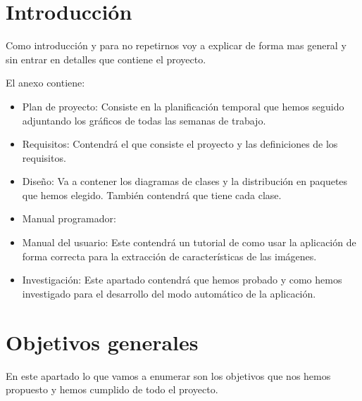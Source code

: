 
\section{Introducción}
Como introducción y para no repetirnos voy a explicar de forma mas general y sin entrar en detalles que contiene el proyecto.


El anexo contiene:

\begin{itemize}
\item Plan de proyecto: Consiste en la planificación temporal que hemos seguido adjuntando los gráficos de todas las semanas de trabajo.
\item Requisitos: Contendrá el que consiste el proyecto y las definiciones de los requisitos.
\item Diseño: Va a contener los diagramas de clases y la distribución en paquetes que hemos elegido. También contendrá que tiene cada clase.
\item Manual programador:
\item Manual del usuario: Este contendrá un tutorial de como usar la aplicación de forma correcta para la extracción de características de las imágenes.
\item Investigación: Este apartado contendrá que hemos probado y como hemos investigado para el desarrollo del modo automático de la aplicación.
\end{itemize}

\section{Objetivos generales}
En este apartado lo que vamos a enumerar son los objetivos que nos hemos propuesto y hemos cumplido de todo el proyecto.


